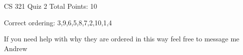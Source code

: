 CS 321
Quiz 2
Total Points: 10

Correct ordering: 3,9,6,5,8,7,2,10,1,4

If you need help with why they are ordered in this way feel free to message me ~ Andrew
